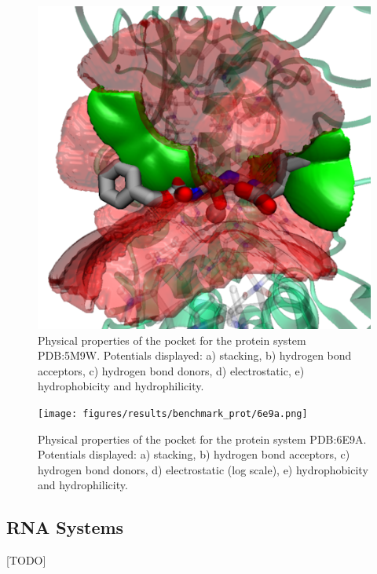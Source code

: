     \begin{figure}[H]
      \centering
      \includegraphics[width=1\textwidth]{figures/results/benchmark_prot/5m9w.png}
      \caption{\label{fig:benchmark/5m9w} Physical properties of the pocket for the protein system PDB:5M9W. Potentials displayed: a) stacking, b) hydrogen bond acceptors, c) hydrogen bond donors, d) electrostatic, e) hydrophobicity and hydrophilicity.}
    \end{figure}

    \begin{figure}[H]
      \centering
      \texttt{[image: figures/results/benchmark\_prot/6e9a.png]}
      \caption{\label{fig:benchmark/6e9a} Physical properties of the pocket for the protein system PDB:6E9A. Potentials displayed: a) stacking, b) hydrogen bond acceptors, c) hydrogen bond donors, d) electrostatic (log scale), e) hydrophobicity and hydrophilicity.}
    \end{figure}

  \subsection{RNA Systems}
    [TODO]

